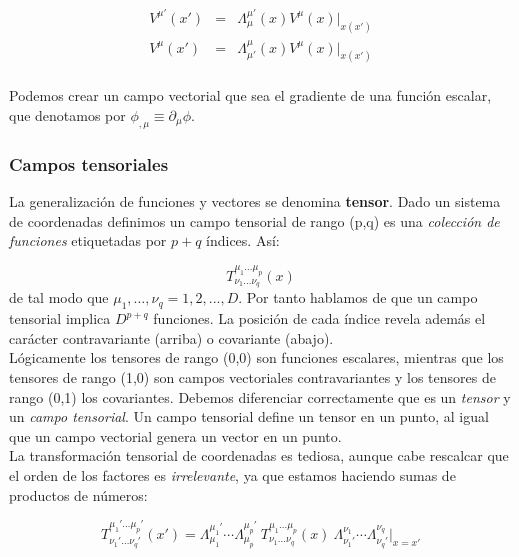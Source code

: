 \documentclass[12pt,a4paper]{book}
\numberwithin{equation}{section}
\numberwithin{figure}{section}
\begin{document}
\begin{eqnarray}
V^{\mu'}(x') & = & \Lambda^{\mu'}_{\mu} (x) V^{\mu}(x) \big\vert_{x(x')} \\
V^{\mu}(x') & = & \Lambda^{\mu}_{\mu'} (x) V^{\mu}(x) \big\vert_{x(x')} \\
\end{eqnarray}

Podemos crear un campo vectorial que sea el gradiente de una función escalar, que denotamos por $\phi_{,\mu} \equiv \partial_{\mu} \phi$. 

\subsubsection{Campos tensoriales}

La generalización de funciones y vectores se denomina \textbf{tensor}. Dado un sistema de coordenadas definimos un campo tensorial de rango (p,q) es una \textit{colección de funciones} etiquetadas por $p+q$ índices. Así:

\begin{equation}
T^{\mu_1\ldots\mu_p}_{\nu_1\ldots\nu_q} (x)
\end{equation}
de tal modo que $\mu_1,\ldots,\nu_q=1,2,...,D$. Por tanto hablamos de que un campo tensorial implica $D^{p+q}$ funciones. La posición de cada índice revela además el carácter contravariante (arriba) o covariante (abajo). \\

Lógicamente los tensores de rango (0,0) son funciones escalares, mientras que los tensores de rango (1,0) son campos vectoriales contravariantes y los tensores de rango (0,1) los covariantes. Debemos diferenciar correctamente que es un \textit{tensor} y un \textit{campo tensorial}. Un campo tensorial define un tensor en un punto, al igual que un campo vectorial genera un vector en un punto. \\

La transformación tensorial de coordenadas es tediosa, aunque cabe rescalcar que el orden de los factores es \textit{irrelevante}, ya que estamos haciendo sumas de productos de números:

\begin{equation}
T^{\mu_1'\ldots\mu_p'}_{\nu_1'\ldots\nu_q'} (x') =  \Lambda^{\mu_1'}_{\mu_1} \cdots  \Lambda^{\mu_p'}_{\mu_p} 
\ T^{\mu_1\ldots\mu_p}_{\nu_1\ldots\nu_q} (x) \ \Lambda^{\nu_1}_{\nu_1'}  \cdots  \Lambda^{\nu_q}_{\nu_q'}  \big\vert_{x=x'} 
\end{equation}
\end{document}
